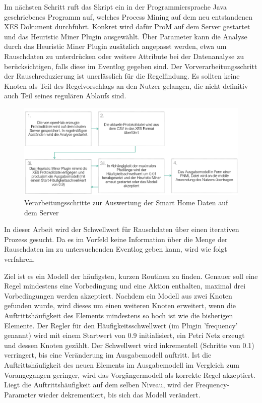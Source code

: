 Im nächsten Schritt ruft das Skript ein in der Programmiersprache Java geschriebenes Programm auf, welches Process Mining auf dem neu entstandenen XES Dokument durchführt. Konkret wird dafür ProM auf dem Server gestartet und das Heuristic Miner Plugin ausgewählt.
Über Parameter kann die Analyse durch das Heuristic Miner Plugin zusätzlich angepasst werden, etwa um Rauschdaten zu unterdrücken oder weitere Attribute bei der Datenanalyse zu berücksichtigen, falls diese im Eventlog gegeben sind. Der Vorverarbeitungsschritt der Rauschreduzierung ist unerlässlich für die Regelfindung. Es sollten keine Knoten als Teil des Regelvorschlags an den Nutzer gelangen, die nicht definitiv auch Teil seines regulären Ablaufs sind. 

\begin{figure}[!h]
    \centering
    \includegraphics[width=\textwidth,origin=c]{figures/Appbildungen/ServerSchritte.PNG}
    \caption{Verarbeitungsschritte zur Auswertung der Smart Home Daten auf dem Server}
    \label{fig:server}
\end{figure}

In dieser Arbeit wird der Schwellwert für Rauschdaten über einen iterativen Prozess gesucht. Da es im Vorfeld keine Information über die Menge der Rauschdaten im zu untersuchenden Eventlog geben kann, wird wie folgt verfahren. 

Ziel ist es ein Modell der häufigsten, kurzen Routinen zu finden. Genauer soll eine Regel mindestens eine Vorbedingung und eine Aktion enthalten, maximal drei Vorbedingungen werden akzeptiert. Nachdem ein Modell aus zwei Knoten gefunden wurde, wird dieses um einen weiteren Knoten erweitert, wenn die Auftrittshäufigkeit des Elements mindestens so hoch ist wie die bisherigen Elemente. Der Regler für den Häufigkeitsschwellwert (im Plugin 'frequency' genannt) wird mit einem Startwert von 0.9 initialisiert, ein Petri Netz erzeugt und dessen Knoten gezählt. Der Schwellwert wird inkrementell (Schritte von 0.1) verringert, bis eine Veränderung im Ausgabemodell auftritt. Ist die Auftrittshäufigkeit des neuen Elements im Ausgabemodell im Vergleich zum Vorangegangen geringer, wird das Vorgängermodell als korrekte Regel akzeptiert. Liegt die Auftrittshäufigkeit auf dem selben Niveau, wird der Frequency-Parameter wieder dekrementiert, bis sich das Modell verändert.

